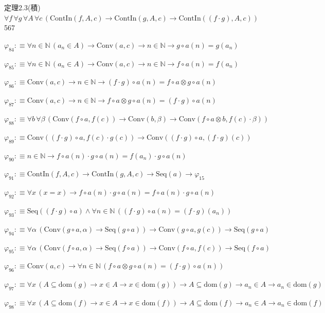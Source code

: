 \begin{fullproof}{定理2.3(積)}{$\forall f\,\forall g\,\forall A\,\forall c\,(\mathrm{ContIn}(f,A,c) \to \mathrm{ContIn}(g,A,c) \to \mathrm{ContIn}((f \cdot g),A,c))$}{567}
\begin{abbrevlist}
\item $\varphi_{84} :\equiv \forall n \in \mathbb{N}\,(a_{n} \in A) \to \mathrm{Conv}(a,c) \to n \in \mathbb{N} \to g \circ a(n) = g(a_{n})$
\item $\varphi_{85} :\equiv \forall n \in \mathbb{N}\,(a_{n} \in A) \to \mathrm{Conv}(a,c) \to n \in \mathbb{N} \to f \circ a(n) = f(a_{n})$
\item $\varphi_{86} :\equiv \mathrm{Conv}(a,c) \to n \in \mathbb{N} \to (f \cdot g) \circ a(n) = f \circ a \otimes g \circ a(n)$
\item $\varphi_{87} :\equiv \mathrm{Conv}(a,c) \to n \in \mathbb{N} \to f \circ a \otimes g \circ a(n) = (f \cdot g) \circ a(n)$
\item $\varphi_{88} :\equiv \forall b\,\forall \beta\,(\mathrm{Conv}(f \circ a,f(c)) \to \mathrm{Conv}(b,\beta) \to \mathrm{Conv}(f \circ a \otimes b,f(c) \cdot \beta))$
\item $\varphi_{89} :\equiv \mathrm{Conv}((f \cdot g) \circ a,f(c) \cdot g(c)) \to \mathrm{Conv}((f \cdot g) \circ a,(f \cdot g)(c))$
\item $\varphi_{90} :\equiv n \in \mathbb{N} \to f \circ a(n) \cdot g \circ a(n) = f(a_{n}) \cdot g \circ a(n)$
\item $\varphi_{91} :\equiv \mathrm{ContIn}(f,A,c) \to \mathrm{ContIn}(g,A,c) \to \mathrm{Seq}(a) \to \varphi_{15}$
\item $\varphi_{92} :\equiv \forall x\,(x = x) \to f \circ a(n) \cdot g \circ a(n) = f \circ a(n) \cdot g \circ a(n)$
\item $\varphi_{93} :\equiv \mathrm{Seq}((f \cdot g) \circ a) \land \forall n \in \mathbb{N}\,((f \cdot g) \circ a(n) = (f \cdot g)(a_{n}))$
\item $\varphi_{94} :\equiv \forall \alpha\,(\mathrm{Conv}(g \circ a,\alpha) \to \mathrm{Seq}(g \circ a)) \to \mathrm{Conv}(g \circ a,g(c)) \to \mathrm{Seq}(g \circ a)$
\item $\varphi_{95} :\equiv \forall \alpha\,(\mathrm{Conv}(f \circ a,\alpha) \to \mathrm{Seq}(f \circ a)) \to \mathrm{Conv}(f \circ a,f(c)) \to \mathrm{Seq}(f \circ a)$
\item $\varphi_{96} :\equiv \mathrm{Conv}(a,c) \to \forall n \in \mathbb{N}\,(f \circ a \otimes g \circ a(n) = (f \cdot g) \circ a(n))$
\item $\varphi_{97} :\equiv \forall x\,(A \subseteq \mathrm{dom}(g) \to x \in A \to x \in \mathrm{dom}(g)) \to A \subseteq \mathrm{dom}(g) \to a_{n} \in A \to a_{n} \in \mathrm{dom}(g)$
\item $\varphi_{98} :\equiv \forall x\,(A \subseteq \mathrm{dom}(f) \to x \in A \to x \in \mathrm{dom}(f)) \to A \subseteq \mathrm{dom}(f) \to a_{n} \in A \to a_{n} \in \mathrm{dom}(f)$

\end{abbrevlist}
\end{fullproof}
